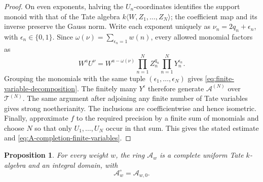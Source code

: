 \documentclass[11pt,reqno]{amsart}
\newtheorem{proposition}[proposition]{Proposition}
\theoremstyle{definition}
\begin{document}
\begin{proof}
On even exponents, halving the $U_n$-coordinates identifies the support
monoid with that of the Tate algebra
$k\langle W,Z_1,\ldots,Z_N\rangle$; the coefficient map and its inverse
preserve the Gauss norm.  Write each exponent uniquely as
$\nu_n=2q_n+\epsilon_n$, with $\epsilon_n\in\{0,1\}$.  Since
$\omega(\nu)=\sum_{\epsilon_n=1}w(n)$, every allowed monomial factors as
\[
  W^aU^\nu
  =W^{a-\omega(\nu)}
   \prod_{n=1}^NZ_n^{q_n}
   \prod_{n=1}^NY_n^{\epsilon_n}.
\]
Grouping the monomials with the same tuple
$(\epsilon_1,\ldots,\epsilon_N)$ gives
\eqref{eq:finite-variable-decomposition}.  The finitely many
$Y^\epsilon$ therefore generate $\mathcal A^{(N)}$ over
$\mathcal T^{(N)}$.
The same argument after adjoining any finite number of Tate variables gives
strong noetherianity.  The inclusions are coefficientwise and hence
isometric.  Finally, approximate $f$ to the required precision by a finite
sum of monomials and choose $N$ so that only
$U_1,\ldots,U_N$ occur in that sum.  This gives the stated estimate and
\eqref{eq:A-completion-finite-variables}.
\end{proof}

\begin{proposition}\label{prop:parity-uniform-domain}
For every weight $w$, the ring $\mathcal A_w$ is a complete uniform Tate
$k$-algebra and an integral domain, with
\[
  \mathcal A_w^\circ=\mathcal A_{w,0}.
\]
\end{proposition}
\end{document}
